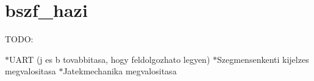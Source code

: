 \chapter{bszf\+\_\+hazi}
\hypertarget{md__r_e_a_d_m_e}{}\label{md__r_e_a_d_m_e}
\label{md__r_e_a_d_m_e_autotoc_md0}%
%


TODO\+:

\texorpdfstring{$\ast$}{*}\+UART (j es b tovabbitasa, hogy feldolgozhato legyen) \texorpdfstring{$\ast$}{*}\+Szegmensenkenti kijelzes megvalositasa \texorpdfstring{$\ast$}{*}\+Jatekmechanika megvalositasa 